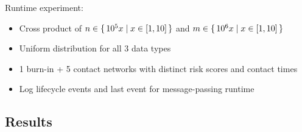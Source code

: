 Runtime experiment:

\begin{itemize}
  \item Cross product of $n \in \set{ 10^5x | x \in [1, 10]}$ and $m \in \set{ 10^6x | x \in [1, 10]}$
  \item Uniform distribution for all 3 data types
  \item 1 burn-in + 5 contact networks with distinct risk scores and contact times
  \item Log lifecycle events and last event for message-passing runtime
\end{itemize}


\subsection{Results}